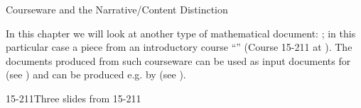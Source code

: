
\begin{tchapter}[id=courseware]{Courseware and the Narrative/Content Distinction}

In this chapter we will look at another type of mathematical document:
{}; in this particular case a piece from an introductory
course ``{}''
(Course 15-211 at {}). The {\omdoc} documents
produced from such courseware can be used as input documents for {\activemath}
(see {}) and can be produced e.g. by {\cpoint} (see
{}).

\begin{myfig}{15-211}{Three slides from 15-211}
  \quad
  \\[1ex]
  \quad
\end{myfig}


\end{tchapter}
